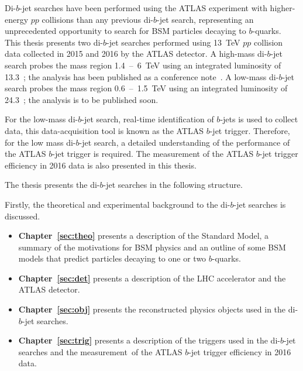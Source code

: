 Di-$b$-jet searches have been performed using the ATLAS experiment
with higher-energy $pp$ collisions than any previous \mbox{di-$b$-jet} search,
representing an unprecedented opportunity to search for BSM particles decaying to $b$-quarks.
This thesis presents two di-$b$-jet searches performed using
13~TeV $pp$ collision data collected in 2015 and 2016 by the ATLAS detector.
A high-mass di-$b$-jet search probes the mass region 1.4~--~6~TeV using an integrated luminosity of 13.3~\ifb{};
the analysis has been published as a conference note~\cite{dibjet-ichep_conf}.
A low-mass di-$b$-jet search probes the mass region 0.6~--~1.5~TeV using an integrated luminosity of 24.3~\ifb{};
the analysis is to be published soon.

For the low-mass di-$b$-jet search, real-time identification of $b$-jets is used to collect data,
this data-acquisition tool is known as the ATLAS $b$-jet trigger.
Therefore, for the low mass di-$b$-jet search, a detailed understanding of the performance of the ATLAS $b$-jet trigger is required.
The measurement of the ATLAS $b$-jet trigger efficiency in 2016 data is also presented in this thesis.

%
\noindent
The thesis presents the di-$b$-jet searches in the following structure.\vspace{-0.5em}

\noindent
Firstly, the theoretical and experimental background to the di-$b$-jet searches is discussed.
\vspace{-0.5em}
\begin{itemize}[leftmargin=*]
\item\textbf{Chapter~\ref{sec:theo}} presents a description of the Standard Model,
  a summary of the motivations for BSM physics and
  an outline of some BSM models that predict particles
  decaying to one or two $b$-quarks.%
\item\textbf{Chapter~\ref{sec:det}} presents a description of the LHC accelerator and the ATLAS detector.%
\item\textbf{Chapter~\ref{sec:obj}} presents the reconstructed physics objects used in the di-$b$-jet searches. %
\item\textbf{Chapter~\ref{sec:trig}} presents a description of the triggers used in the di-$b$-jet searches
  and the measurement~of the ATLAS $b$-jet trigger efficiency in 2016 data. %
\end{itemize}

